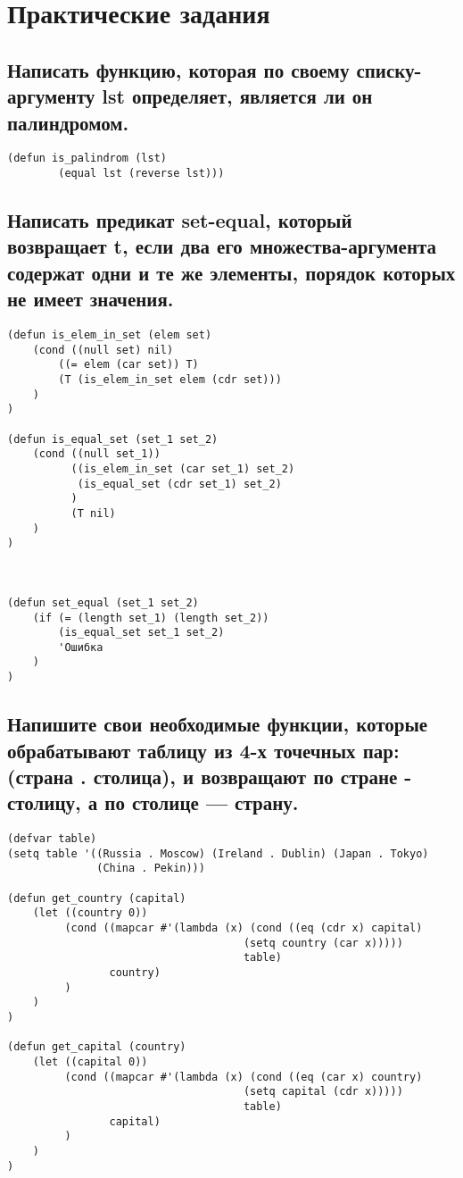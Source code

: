 \chapter{Практические задания}
\section{Написать функцию, которая по своему списку-аргументу lst определяет, является ли он палиндромом.}
\begin{lstlisting}[basicstyle=\footnotesize, caption=Задание 1]
	(defun is_palindrom (lst) 
		(equal lst (reverse lst)))
\end{lstlisting}

\section{Написать предикат set-equal, который возвращает t, если два его множества-аргумента содержат одни и те же элементы, порядок которых не имеет значения.}
\begin{lstlisting}[basicstyle=\footnotesize, caption=Задание 2]
(defun is_elem_in_set (elem set)
	(cond ((null set) nil)
		((= elem (car set)) T)
		(T (is_elem_in_set elem (cdr set)))
	)
)

(defun is_equal_set (set_1 set_2)
	(cond ((null set_1))
		  ((is_elem_in_set (car set_1) set_2) 
		   (is_equal_set (cdr set_1) set_2)
		  )
	   	  (T nil)
	)
)



(defun set_equal (set_1 set_2)
	(if (= (length set_1) (length set_2)) 
	    (is_equal_set set_1 set_2) 
	    'Ошибка
	)
)
\end{lstlisting}

\section{Напишите свои необходимые функции, которые обрабатывают таблицу из 4-х точечных пар: (страна . столица), и возвращают по стране - столицу, а по столице — страну.}
\begin{lstlisting}[basicstyle=\footnotesize, caption=Задание 3]
(defvar table)
(setq table '((Russia . Moscow) (Ireland . Dublin) (Japan . Tokyo) 
              (China . Pekin)))

(defun get_country (capital)
	(let ((country 0))
		 (cond ((mapcar #'(lambda (x) (cond ((eq (cdr x) capital) 
									 (setq country (car x))))) 
									 table) 
				country)
		 )
	)
)

(defun get_capital (country)
	(let ((capital 0))
		 (cond ((mapcar #'(lambda (x) (cond ((eq (car x) country) 
		                             (setq capital (cdr x))))) 
		                             table) 
		        capital)
		 )
	)
)
\end{lstlisting}

